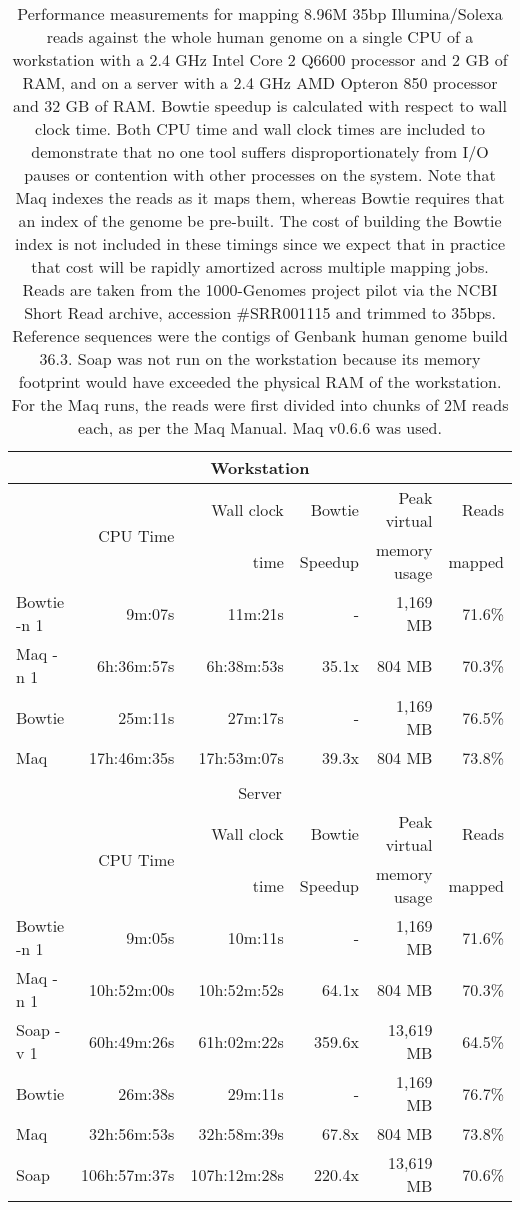 \documentclass[letterpaper]{article}
\begin{document}
\begin{table}[tp]
\scriptsize
\begin{tabular}{lrrrrr}
\multicolumn{6}{c}{\small{Workstation}} \\[3pt]
\toprule
 & \multirow{2}{*}{CPU Time} & Wall clock & Bowtie  & Peak virtual & Reads  \\
 &                            & time       & Speedup & memory usage & mapped \\[3pt]
\toprule
Bowtie -n 1 & 9m:07s & 11m:21s & - & 1,169 MB & 71.6\%\\\midrule
Maq -n 1 & 6h:36m:57s & 6h:38m:53s & 35.1x & 804 MB & 70.3\%\\\midrule
\midrule
Bowtie & 25m:11s & 27m:17s & - & 1,169 MB & 76.5\%\\\midrule
Maq & 17h:46m:35s & 17h:53m:07s & 39.3x & 804 MB & 73.8\%\\
\toprule\\[1pt]
\multicolumn{6}{c}{\small{Server}} \\[3pt]
\toprule
 & \multirow{2}{*}{CPU Time} & Wall clock & Bowtie  & Peak virtual & Reads  \\
 &                            & time       & Speedup & memory usage & mapped \\[3pt]
\toprule
Bowtie -n 1 & 9m:05s & 10m:11s & - & 1,169 MB & 71.6\%\\\midrule
Maq -n 1 & 10h:52m:00s & 10h:52m:52s & 64.1x & 804 MB & 70.3\%\\\midrule
Soap -v 1 & 60h:49m:26s & 61h:02m:22s & 359.6x & 13,619 MB & 64.5\%\\\midrule
\midrule
Bowtie & 26m:38s & 29m:11s & - & 1,169 MB & 76.7\%\\\midrule
Maq & 32h:56m:53s & 32h:58m:39s & 67.8x & 804 MB & 73.8\%\\\midrule
Soap & 106h:57m:37s & 107h:12m:28s & 220.4x & 13,619 MB & 70.6\%\\
\bottomrule
\end{tabular}
\caption{Performance measurements for mapping 8.96M 35bp Illumina/Solexa reads against the whole human genome on a single CPU of a workstation with a 2.4 GHz Intel Core 2 Q6600 processor and 2 GB of RAM, and on a server with a 2.4 GHz AMD Opteron 850 processor and 32 GB of RAM. Bowtie speedup is calculated with respect to wall clock time. Both CPU time and wall clock times are included to demonstrate that no one tool suffers disproportionately from I/O pauses or contention with other processes on the system. Note that Maq indexes the reads as it maps them, whereas Bowtie requires that an index of the genome be pre-built.  The cost of building the Bowtie index is not included in these timings since we expect that in practice that cost will be rapidly amortized across multiple mapping jobs. Reads are taken from the 1000-Genomes project pilot via the NCBI Short Read archive, accession \#SRR001115 and trimmed to 35bps. Reference sequences were the contigs of Genbank human genome build 36.3. Soap was not run on the workstation because its memory footprint would have exceeded the physical RAM of the workstation. For the Maq runs, the reads were first divided into chunks of 2M reads each, as per the Maq Manual. Maq v0.6.6 was used. }
\end{table}
\end{document}
